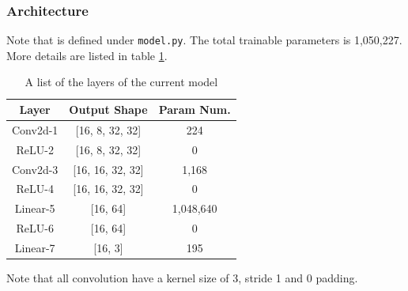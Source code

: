 \documentclass[a4paper, 10]{article}
\begin{document}
        \subsubsection{Architecture} 
            Note that is defined under \verb|model.py|. The total trainable parameters is
            1,050,227. More details are listed in table \ref{table:1}. 
            \begin{table}[h!]
                \centering
                \begin{tabular}{|c|c|c|}
                    \hline
                    Layer               &   Output Shape               & Param Num. \\
                    \hline
                    Conv2d-1            &   [16, 8, 32, 32]            & 224 \\
                    ReLU-2              &   [16, 8, 32, 32]            & 0 \\
                    Conv2d-3            &   [16, 16, 32, 32]           & 1,168 \\
                    ReLU-4              &   [16, 16, 32, 32]           &     0 \\
                    Linear-5            &   [16, 64]                   & 1,048,640 \\
                    ReLU-6              &   [16, 64]                   &     0 \\
                    Linear-7            &   [16, 3]                    & 195    \\
                    \hline
                \end{tabular}
                \caption{A list of the layers of the current model}
                \label{table:1}
            \end{table}
            Note that all convolution have a kernel size of 3, stride 1 and 0 padding.
\end{document}
